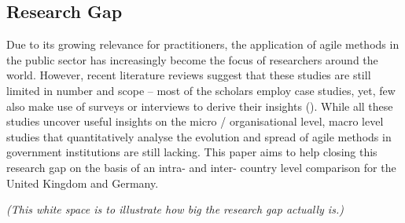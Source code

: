 \subsection{Research Gap}\label{Research Gap}
Due to its growing relevance for practitioners, the application of agile methods in the public sector has increasingly become the focus of researchers around the world. However, recent literature reviews suggest that these studies are still limited in number and scope – most of the scholars employ case studies, yet, few also make use of surveys or interviews to derive their insights (\cite{CarvalhoFernandes2016, Vacari2015, Mergel2018, Mergel}). While all these studies uncover useful insights on the micro / organisational level, macro level studies that quantitatively analyse the evolution and spread of agile methods in government institutions are still lacking. This paper aims to help closing this research gap on the basis of an intra- and inter- country level comparison for the United Kingdom and Germany. 


\vspace{12cm}

\begin{center}
\tiny{\textit{(This white space is to illustrate how big the research gap actually is.)}}
\end{center}